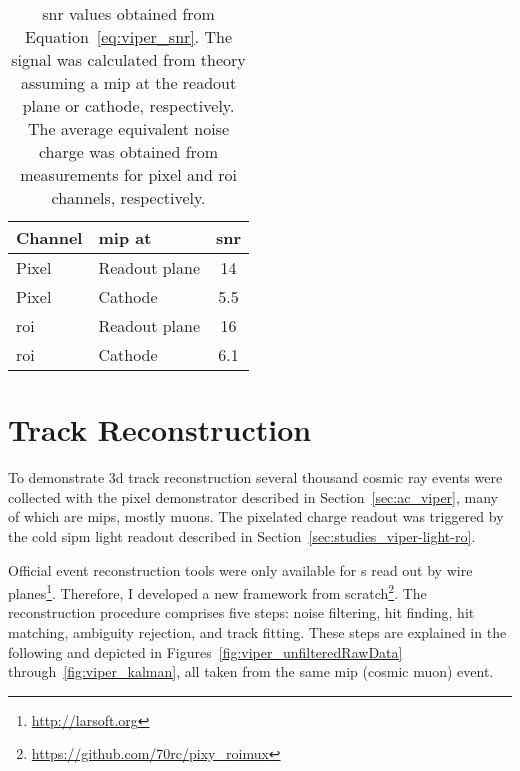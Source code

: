 \begin{table}[htb]
	\centering
	\caption[Pixel demonstrator ]{%
		\acrshort{snr} values obtained from Equation~\eqref{eq:viper_snr}.
		The signal was calculated from theory assuming a \acrshort{mip} at the readout plane or cathode, respectively.
		The average equivalent noise charge was obtained from measurements for pixel and \acrshort{roi} channels, respectively.
	}
	\label{tab:viper_snr}
	\begin{tabu} to \textwidth {llS}
		\toprule
		Channel &			\acrshort{mip} at &	{\acrshort{snr}} \\
		\midrule
		Pixel &				Readout plane &		14 \\
		Pixel &				Cathode &			5.5 \\
		\acrshort{roi} &	Readout plane &		16 \\
		\acrshort{roi} &	Cathode &			6.1 \\
		\bottomrule
	\end{tabu}
\end{table}


\section{ Track Reconstruction}
\label{sec:ac_reco}


To demonstrate \gls{3d} track reconstruction several thousand cosmic ray events were collected with the \AC{} pixel demonstrator described in Section~\ref{sec:ac_viper}, many of which are \glspl{mip}, mostly muons.
The pixelated charge readout was triggered by the cold \gls{sipm} light readout described in Section~\ref{sec:studies_viper-light-ro}.

Official event reconstruction tools were only available for \lartpc{}s read out by wire planes\footnote{\url{http://larsoft.org}}.
Therefore, I developed a new framework from scratch\footnote{\url{https://github.com/70rc/pixy_roimux}}.
The reconstruction procedure comprises five steps: noise filtering, hit finding, hit matching, ambiguity rejection, and track fitting.
These steps are explained in the following and depicted in Figures~\ref{fig:viper_unfilteredRawData} through~\ref{fig:viper_kalman}, all taken from the same \gls{mip} (cosmic muon) event.

